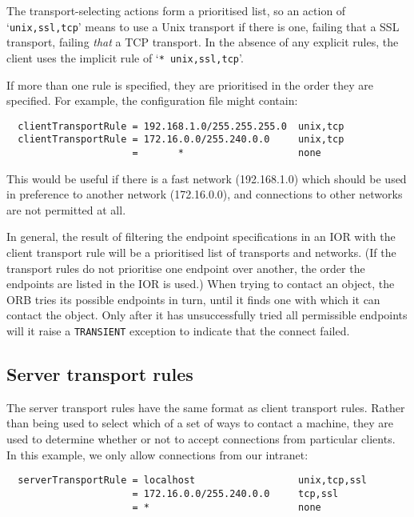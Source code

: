 \documentclass[11pt,twoside,a4paper]{book}
\newcommand{\code}[1]{\texttt{#1}}
\newcommand{\dsc}{\discretionary{}{}{}}
\begin{document}
\vspace{\baselineskip}

\noindent The transport-selecting actions form a prioritised list, so
an action of `\code{unix,ssl,\dsc{}tcp}' means to use a Unix transport if
there is one, failing that a SSL transport, failing \emph{that} a TCP
transport. In the absence of any explicit rules, the client uses the
implicit rule of `\code{* unix,ssl,tcp}'.

If more than one rule is specified, they are prioritised in the order
they are specified. For example, the configuration file might contain:

\begin{verbatim}
  clientTransportRule = 192.168.1.0/255.255.255.0  unix,tcp
  clientTransportRule = 172.16.0.0/255.240.0.0     unix,tcp
                      =       *                    none
\end{verbatim}

\noindent This would be useful if there is a fast network
(192.168.1.0) which should be used in preference to another network
(172.16.0.0), and connections to other networks are not permitted at
all.

In general, the result of filtering the endpoint specifications in an
IOR with the client transport rule will be a prioritised list of
transports and networks. (If the transport rules do not prioritise one
endpoint over another, the order the endpoints are listed in the IOR
is used.)  When trying to contact an object, the ORB tries its
possible endpoints in turn, until it finds one with which it can
contact the object. Only after it has unsuccessfully tried all
permissible endpoints will it raise a \code{TRANSIENT} exception to
indicate that the connect failed.



\subsection{Server transport rules}
\label{sec:serverRule}

The server transport rules have the same format as client transport
rules. Rather than being used to select which of a set of ways to
contact a machine, they are used to determine whether or not to accept
connections from particular clients. In this example, we only allow
connections from our intranet:

\begin{verbatim}
  serverTransportRule = localhost                  unix,tcp,ssl
                      = 172.16.0.0/255.240.0.0     tcp,ssl
                      = *                          none
\end{verbatim}
\end{document}
